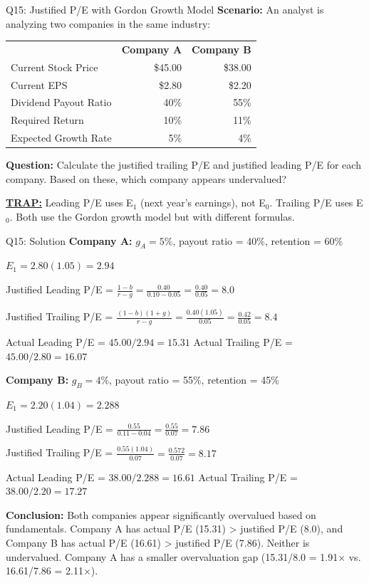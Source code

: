 \documentclass{beamer}
\renewcommand{\scriptsize}{\fontsize{6pt}{7pt}\selectfont}
\begin{document}
	\begin{frame}{Q15: Justified P/E with Gordon Growth Model}
		\scriptsize
		\textbf{Scenario:} An analyst is analyzing two companies in the same industry:
		
		\begin{tabular}{lrr}
			& \textbf{Company A} & \textbf{Company B} \\
			Current Stock Price & \$45.00 & \$38.00 \\
			Current EPS & \$2.80 & \$2.20 \\
			Dividend Payout Ratio & 40\% & 55\% \\
			Required Return & 10\% & 11\% \\
			Expected Growth Rate & 5\% & 4\% \\
		\end{tabular}
		
		\textbf{Question:} Calculate the justified trailing P/E and justified leading P/E for each company. Based on these, which company appears undervalued?
		
		\vspace{2pt}
		\underline{\textbf{TRAP:}} Leading P/E uses E$_1$ (next year's earnings), not E$_0$. Trailing P/E uses E$_0$. Both use the Gordon growth model but with different formulas.
	\end{frame}
	
	\begin{frame}{Q15: Solution}
		\scriptsize
		\textbf{Company A:}
		$g_A = 5\%$, payout ratio = 40\%, retention = 60\%
		
		$E_1 = 2.80(1.05) = 2.94$
		
		Justified Leading P/E = $\frac{1-b}{r-g} = \frac{0.40}{0.10-0.05} = \frac{0.40}{0.05} = 8.0$
		
		Justified Trailing P/E = $\frac{(1-b)(1+g)}{r-g} = \frac{0.40(1.05)}{0.05} = \frac{0.42}{0.05} = 8.4$
		
		Actual Leading P/E = $45.00/2.94 = 15.31$
		Actual Trailing P/E = $45.00/2.80 = 16.07$
		
		\vspace{2pt}
		\textbf{Company B:}
		$g_B = 4\%$, payout ratio = 55\%, retention = 45\%
		
		$E_1 = 2.20(1.04) = 2.288$
		
		Justified Leading P/E = $\frac{0.55}{0.11-0.04} = \frac{0.55}{0.07} = 7.86$
		
		Justified Trailing P/E = $\frac{0.55(1.04)}{0.07} = \frac{0.572}{0.07} = 8.17$
		
		Actual Leading P/E = $38.00/2.288 = 16.61$
		Actual Trailing P/E = $38.00/2.20 = 17.27$
		
		\vspace{2pt}
		\textbf{Conclusion:} Both companies appear significantly overvalued based on fundamentals. Company A has actual P/E (15.31) > justified P/E (8.0), and Company B has actual P/E (16.61) > justified P/E (7.86). Neither is undervalued. Company A has a smaller overvaluation gap (15.31/8.0 = 1.91× vs. 16.61/7.86 = 2.11×).
	\end{frame}
	
\end{document}
